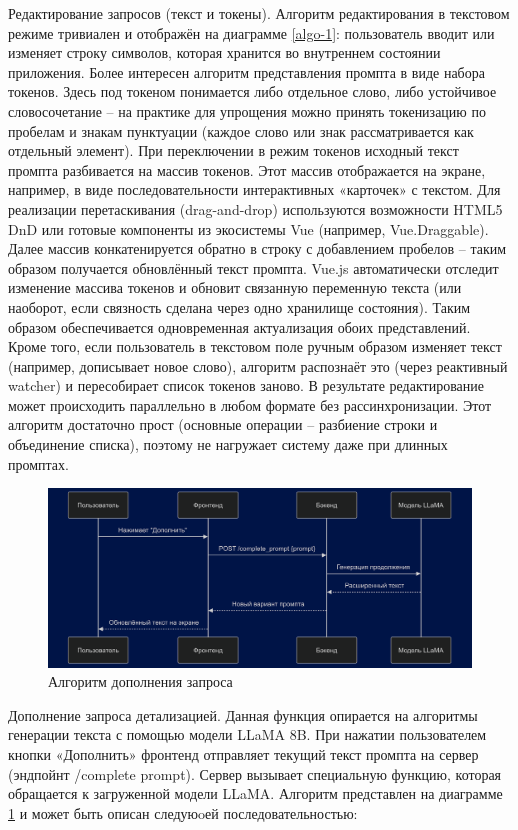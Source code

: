 Редактирование запросов (текст и токены). Алгоритм редактирования в текстовом режиме тривиален и отображён на диаграмме \ref{algo-1}: пользователь вводит или изменяет строку символов, которая хранится во внутреннем состоянии приложения. Более интересен алгоритм представления промпта в виде набора токенов. Здесь под токеном понимается либо отдельное слово, либо устойчивое словосочетание – на практике для упрощения можно принять токенизацию по пробелам и знакам пунктуации (каждое слово или знак рассматривается как отдельный элемент). При переключении в режим токенов исходный текст промпта разбивается на массив токенов. Этот массив отображается на экране, например, в виде последовательности интерактивных «карточек» с текстом. Для реализации перетаскивания (drag-and-drop) используются возможности HTML5 DnD или готовые компоненты из экосистемы Vue (например, Vue.Draggable). Далее массив конкатенируется обратно в строку с добавлением пробелов – таким образом получается обновлённый текст промпта. Vue.js автоматически отследит изменение массива токенов и обновит связанную переменную текста (или наоборот, если связность сделана через одно хранилище состояния). Таким образом обеспечивается одновременная актуализация обоих представлений. Кроме того, если пользователь в текстовом поле ручным образом изменяет текст (например, дописывает новое слово), алгоритм распознаёт это (через реактивный watcher) и пересобирает список токенов заново. В результате редактирование может происходить параллельно в любом формате без рассинхронизации. Этот алгоритм достаточно прост (основные операции – разбиение строки и объединение списка), поэтому не нагружает систему даже при длинных промптах.
\begin{figure}[htbp]
    \centering
    \includegraphics[width=1\textwidth]{picture/diploma-inter-algo-2.png}
    \caption{Алгоритм дополнения запроса}
    \label{algo-2}
\end{figure}
Дополнение запроса детализацией. Данная функция опирается на алгоритмы генерации текста с помощью модели LLaMA 8B. При нажатии пользователем кнопки «Дополнить» фронтенд отправляет текущий текст промпта на сервер (эндпойнт /complete prompt). Сервер вызывает специальную функцию, которая обращается к загруженной модели LLaMA. Алгоритм представлен на диаграмме \ref{algo-2} и может быть описан следуюoей последовательностью:
